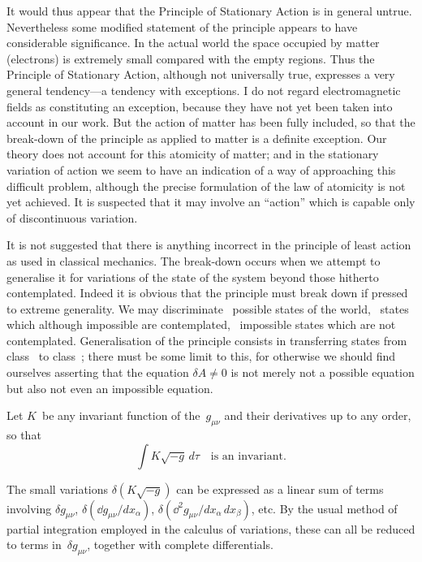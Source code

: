 \documentclass[12pt]{book}
\begin{document}
It would thus appear that the Principle of Stationary Action is in general
%
untrue. Nevertheless some modified statement of the principle appears to
have considerable significance. In the actual world the space occupied by
matter (electrons) is extremely small compared with the empty regions. Thus
the Principle of Stationary Action, although not universally true, expresses a
very general tendency---a tendency with exceptions\footnotemark.\footnotetext
  {I do not regard electromagnetic fields as constituting an exception, because they have not
  yet been taken into account in our work. But the action of matter has been fully included, so
  that the break-down of the principle as applied to matter is a definite exception.}
Our theory does not
account for this atomicity of matter; and in the stationary variation of action
%
we seem to have an indication of a way of approaching this difficult problem,
although the precise formulation of the law of atomicity is not yet achieved.
It is suspected that it may involve an ``action'' which is capable only of
discontinuous variation.

It is not suggested that there is anything incorrect in the principle of
least action as used in classical mechanics. The break-down occurs when we
attempt to generalise it for variations of the state of the system beyond those
hitherto contemplated. Indeed it is obvious that the principle must break
down if pressed to extreme generality. We may discriminate ~possible
states of the world, ~states which although impossible are contemplated,
~impossible states which are not contemplated. Generalisation of the principle
consists in transferring states from class~ to class~; there must be
some limit to this, for otherwise we should find ourselves asserting that the
equation $\delta A \neq 0$ is not merely not a possible equation but also not even an
impossible equation.


Let $K$~be any invariant function of the~$g_{\mu\nu}$ and their derivatives up to any
order, so that
\[
\int K \sqrt{-g}\, d\tau\quad\text{is an invariant.}
\]

The small variations $\delta(K \sqrt{-g})$ can be expressed as a linear sum of terms
involving $\delta g_{\mu\nu}$, $\delta(\dd g_{\mu\nu}/dx_{\alpha})$, $\delta(\dd^{2} g_{\mu\nu}/dx_{\alpha}\, dx_{\beta})$, etc. By the usual method of partial
integration employed in the calculus of variations, these can all be reduced to
terms in~$\delta g_{\mu\nu}$, together with complete differentials.
\end{document}
